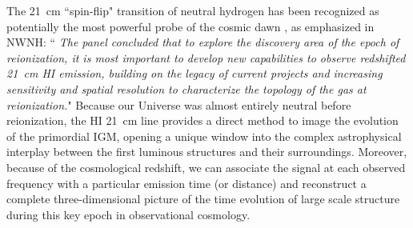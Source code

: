 \documentclass[preprint]{aastex}
\newcommand{\Mycitep}[1]{{\bf \citep{#1}}}
\newcommand{\Caption}[4]{\vspace{#1}\renewcommand{\baselinestretch}{#2}\caption{#4}\vspace{#3}}
\def\HI{{H{\small I }}}
\begin{document}
The 21~cm ``spin-flip" transition of  neutral hydrogen has been recognized as potentially the most powerful probe 
of the cosmic dawn \Mycitep{morales_wyithe2010, furlanetto_et_al2006}, as emphasized in NWNH: 
``{\it 
The panel concluded that  to explore the discovery area of the epoch of reionization, it is most important to 
develop new capabilities to observe redshifted 21~cm \HI emission, building on the legacy of current projects and 
increasing sensitivity and spatial resolution to characterize the topology of the gas at reionization.}"  Because 
our Universe was almost entirely neutral before reionization, the HI 21~cm line provides a direct method to image 
the evolution of the primordial IGM, opening a unique window into the complex astrophysical interplay between the 
first luminous structures and their surroundings. Moreover, because of the cosmological redshift, we can associate 
the signal at each observed frequency with a particular emission time (or distance) and reconstruct a complete 
three-dimensional picture of the time evolution of large scale structure during this key epoch in 
observational cosmology. 

\end{document}
